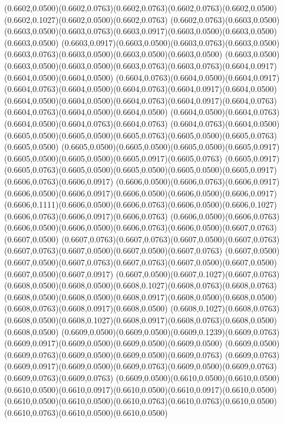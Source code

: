 (0.6602,0.0500)(0.6602,0.0763)(0.6602,0.0763)(0.6602,0.0763)(0.6602,0.0500)(0.6602,0.1027)(0.6602,0.0500)(0.6602,0.0763)
(0.6602,0.0763)(0.6603,0.0500)(0.6603,0.0500)(0.6603,0.0763)(0.6603,0.0917)(0.6603,0.0500)(0.6603,0.0500)(0.6603,0.0500)
(0.6603,0.0917)(0.6603,0.0500)(0.6603,0.0763)(0.6603,0.0500)(0.6603,0.0763)(0.6603,0.0500)(0.6603,0.0500)(0.6603,0.0500)
(0.6603,0.0500)(0.6603,0.0500)(0.6603,0.0500)(0.6603,0.0763)(0.6603,0.0763)(0.6604,0.0917)(0.6604,0.0500)(0.6604,0.0500)
(0.6604,0.0763)(0.6604,0.0500)(0.6604,0.0917)(0.6604,0.0763)(0.6604,0.0500)(0.6604,0.0763)(0.6604,0.0917)(0.6604,0.0500)
(0.6604,0.0500)(0.6604,0.0500)(0.6604,0.0763)(0.6604,0.0917)(0.6604,0.0763)(0.6604,0.0763)(0.6604,0.0500)(0.6604,0.0500)
(0.6604,0.0500)(0.6604,0.0763)(0.6604,0.0500)(0.6604,0.0763)(0.6604,0.0763)
\PST@Solid(0.6604,0.0763)(0.6604,0.0500)(0.6605,0.0500)(0.6605,0.0500)(0.6605,0.0763)(0.6605,0.0500)(0.6605,0.0763)(0.6605,0.0500)
(0.6605,0.0500)(0.6605,0.0500)(0.6605,0.0500)(0.6605,0.0917)(0.6605,0.0500)(0.6605,0.0500)(0.6605,0.0917)(0.6605,0.0763)
(0.6605,0.0917)(0.6605,0.0763)(0.6605,0.0500)(0.6605,0.0500)(0.6605,0.0500)(0.6605,0.0917)(0.6606,0.0763)(0.6606,0.0917)
(0.6606,0.0500)(0.6606,0.0763)(0.6606,0.0917)(0.6606,0.0500)(0.6606,0.0917)(0.6606,0.0500)(0.6606,0.0500)(0.6606,0.0917)
(0.6606,0.1111)(0.6606,0.0500)(0.6606,0.0763)(0.6606,0.0500)(0.6606,0.1027)(0.6606,0.0763)(0.6606,0.0917)(0.6606,0.0763)
(0.6606,0.0500)(0.6606,0.0763)(0.6606,0.0500)(0.6606,0.0500)(0.6606,0.0763)(0.6606,0.0500)(0.6607,0.0763)(0.6607,0.0500)
(0.6607,0.0763)(0.6607,0.0763)(0.6607,0.0500)(0.6607,0.0763)(0.6607,0.0763)(0.6607,0.0500)(0.6607,0.0500)(0.6607,0.0763)
(0.6607,0.0500)(0.6607,0.0500)(0.6607,0.0763)(0.6607,0.0763)(0.6607,0.0500)(0.6607,0.0500)(0.6607,0.0500)(0.6607,0.0917)
(0.6607,0.0500)(0.6607,0.1027)(0.6607,0.0763)(0.6608,0.0500)(0.6608,0.0500)(0.6608,0.1027)(0.6608,0.0763)(0.6608,0.0763)
(0.6608,0.0500)(0.6608,0.0500)(0.6608,0.0917)(0.6608,0.0500)(0.6608,0.0500)(0.6608,0.0763)(0.6608,0.0917)(0.6608,0.0500)
(0.6608,0.1027)(0.6608,0.0763)(0.6608,0.0500)(0.6608,0.1027)(0.6608,0.0917)(0.6608,0.0763)(0.6608,0.0500)(0.6608,0.0500)
(0.6609,0.0500)(0.6609,0.0500)(0.6609,0.1239)(0.6609,0.0763)(0.6609,0.0917)(0.6609,0.0500)(0.6609,0.0500)(0.6609,0.0500)
(0.6609,0.0500)(0.6609,0.0763)(0.6609,0.0500)(0.6609,0.0500)(0.6609,0.0763)
\PST@Solid(0.6609,0.0763)(0.6609,0.0917)(0.6609,0.0500)(0.6609,0.0763)(0.6609,0.0500)(0.6609,0.0763)(0.6609,0.0763)(0.6609,0.0763)
(0.6609,0.0500)(0.6610,0.0500)(0.6610,0.0500)(0.6610,0.0500)(0.6610,0.0917)(0.6610,0.0500)(0.6610,0.0917)(0.6610,0.0500)
(0.6610,0.0500)(0.6610,0.0500)(0.6610,0.0763)(0.6610,0.0763)(0.6610,0.0500)(0.6610,0.0763)(0.6610,0.0500)(0.6610,0.0500)
